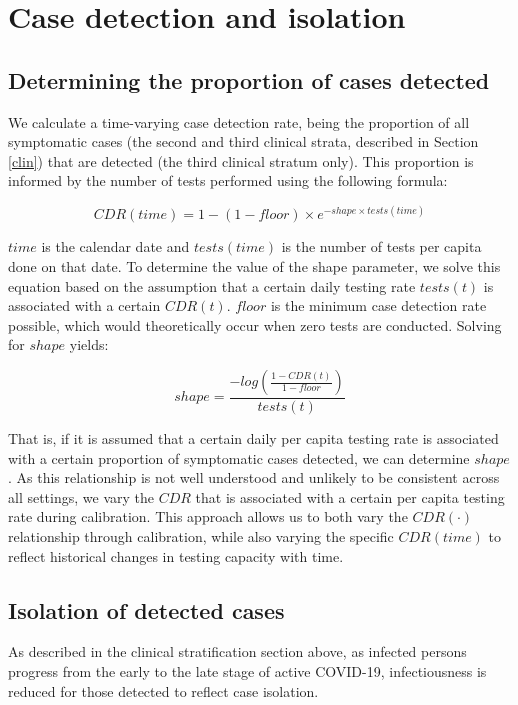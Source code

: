 \section{Case detection and isolation} \label{cdr}

\subsection{Determining the proportion of cases detected}
We calculate a time-varying case detection rate, being the proportion of all symptomatic cases (the second and third clinical strata, described in Section \ref{clin}) that are detected (the third clinical stratum only).
This proportion is informed by the number of tests performed using the following formula:

\[CDR(time)=1-(1-floor)\times e^{-shape \times tests(time)}\]

$time$ is the calendar date and $tests(time)$ is the number of tests per capita done on that date. To determine the value of the shape parameter, we solve this equation based on the assumption that a certain daily testing rate $tests(t)$ is associated with a certain $CDR(t)$.
$floor$ is the minimum case detection rate possible, which would theoretically occur when zero tests are conducted.
Solving for $shape$ yields:

\[shape = \frac{-log(\frac{1 - CDR(t)}{1 - floor})}{tests(t)}\]

That is, if it is assumed that a certain daily per capita testing rate is associated with a certain proportion of symptomatic cases detected, we can determine $shape$.
As this relationship is not well understood and unlikely to be consistent across all settings, we vary the $CDR$ that is associated with a certain per capita testing rate during calibration.
This approach allows us to both vary the $CDR(\cdot)$ relationship through calibration,
while also varying the specific $CDR(time)$ to reflect historical changes in testing capacity with time.

\subsection{Isolation of detected cases}
As described in the clinical stratification section above, as infected persons progress from the early to the late stage of active COVID-19, infectiousness is reduced for those detected to reflect case isolation.

